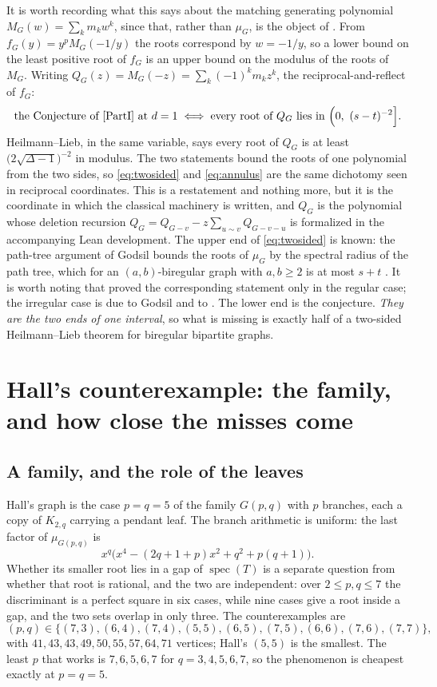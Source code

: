 \documentclass[11pt]{article}
\theoremstyle{remark}
\begin{document}
It is worth recording what this says about the matching generating polynomial
$M_G(w)=\sum_km_kw^k$, since that, rather than $\mu_G$, is the object of
\cite{HL}. From $f_G(y)=y^pM_G(-1/y)$ the roots correspond by $w=-1/y$, so a
lower bound on the least positive root of $f_G$ is an upper bound on the modulus
of the roots of $M_G$. Writing $Q_G(z)=M_G(-z)=\sum_k(-1)^km_kz^k$, the
reciprocal-and-reflect of $f_G$:
\begin{equation}\label{eq:annulus}
\text{the Conjecture of \cite{PartI} at }d=1
\iff
\text{every root of }Q_G\text{ lies in }\Bigl(0,\ (s-t)^{-2}\Bigr].
\end{equation}
Heilmann--Lieb, in the same variable, says every root of $Q_G$ is at least
$\bigl(2\sqrt{\Delta-1}\bigr)^{-2}$ in modulus. The two statements bound the
roots of one polynomial from the two sides, so \eqref{eq:twosided} and
\eqref{eq:annulus} are the same dichotomy seen in reciprocal coordinates. This
is a restatement and nothing more, but it is the coordinate in which the
classical machinery is written, and $Q_G$ is the polynomial whose deletion
recursion $Q_G=Q_{G-v}-z\sum_{u\sim v}Q_{G-v-u}$ is formalized in the
accompanying Lean development. The upper end of
\eqref{eq:twosided} is known: the path-tree argument of Godsil bounds the roots
of $\mu_G$ by the spectral radius of the path tree, which for an
$(a,b)$-biregular graph with $a,b\ge2$ is at most $s+t$
\cite{God81,God93}. It is worth
noting that \cite{HL} proved the corresponding statement only in the regular
case; the irregular case is due to Godsil and to \cite{MSS}. The lower end is
the conjecture. \emph{They are the two ends of one interval}, so
what is missing is exactly half of a two-sided Heilmann--Lieb theorem for
biregular bipartite graphs.



\section{Hall’s counterexample: the family, and how close the misses come}

\subsection{A family, and the role of the leaves}\label{sec:hallfamily}

Hall's graph is the case $p=q=5$ of the family $G(p,q)$ with $p$ branches, each a copy of
$K_{2,q}$ carrying a pendant leaf. The branch arithmetic is uniform: the last factor of
$\mu_{G(p,q)}$ is
\[
   x^{q}\bigl(x^4-(2q+1+p)x^2+q^2+p(q+1)\bigr).
\]
Whether its smaller root lies in a gap of $\operatorname{spec}(T)$ is a separate question
from whether that root is rational, and the two are independent: over $2\le p,q\le7$ the
discriminant is a perfect square in six cases, while nine cases give a root inside a gap,
and the two sets overlap in only three. The counterexamples are
\[
   (p,q)\in\{(7,3),(6,4),(7,4),(5,5),(6,5),(7,5),(6,6),(7,6),(7,7)\},
\]
with $41,43,43,49,50,55,57,64,71$ vertices; Hall's $(5,5)$ is the smallest. The least $p$
that works is $7,6,5,6,7$ for $q=3,4,5,6,7$, so the phenomenon is cheapest exactly at
$p=q=5$.
\end{document}
